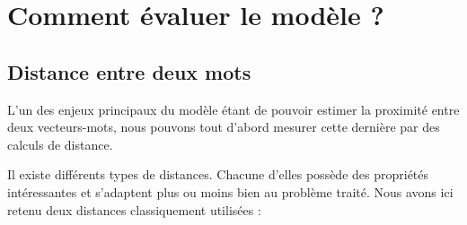 \documentclass[11pt,french,french]{article}
\begin{document}
\newpage

\hypertarget{appendix-appendix}{%
\appendix}


\hypertarget{annexe:commentEvaluer}{%
\section{Comment évaluer le modèle ?}\label{annexe:commentEvaluer}}

\hypertarget{distance-entre-deux-mots}{%
\subsection{Distance entre deux mots}\label{distance-entre-deux-mots}}

L'un des enjeux principaux du modèle étant de pouvoir estimer la proximité entre deux vecteurs-mots, nous pouvons tout d'abord mesurer cette dernière par des calculs de distance.

Il existe différents types de distances. Chacune d'elles possède des propriétés intéressantes et s'adaptent plus ou moins bien au problème traité. Nous avons ici retenu deux distances classiquement utilisées :
\end{document}
